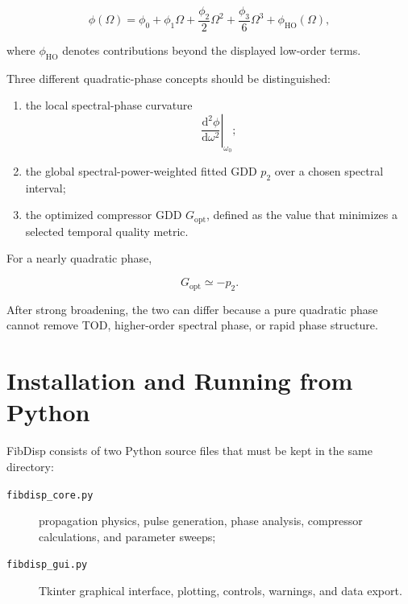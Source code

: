 \documentclass[11pt,a4paper]{article}
\newcommand{\dd}{\mathrm{d}}
\begin{document}
\begin{equation}
\phi(\Omega)
=
\phi_0+\phi_1\Omega
+\frac{\phi_2}{2}\Omega^2
+\frac{\phi_3}{6}\Omega^3
+\phi_{\mathrm{HO}}(\Omega),
\end{equation}

where $\phi_{\mathrm{HO}}$ denotes contributions beyond the displayed low-order
terms.

Three different quadratic-phase concepts should be distinguished:

\begin{enumerate}
    \item the local spectral-phase curvature
    \[
    \left.\frac{\dd^2\phi}{\dd\omega^2}\right|_{\omega_0};
    \]
    \item the global spectral-power-weighted fitted GDD $p_2$ over a chosen
    spectral interval;
    \item the optimized compressor GDD $G_{\mathrm{opt}}$, defined as the value
    that minimizes a selected temporal quality metric.
\end{enumerate}

For a nearly quadratic phase,

\begin{equation}
G_{\mathrm{opt}}\simeq-p_2.
\end{equation}

After strong broadening, the two can differ because a pure quadratic phase
cannot remove TOD, higher-order spectral phase, or rapid phase structure.

\section{Installation and Running from Python}

FibDisp consists of two Python source files that must be kept in the same
directory:

\begin{description}
    \item[\texttt{fibdisp\_core.py}] propagation physics, pulse generation,
    phase analysis, compressor calculations, and parameter sweeps;
    \item[\texttt{fibdisp\_gui.py}] Tkinter graphical interface, plotting,
    controls, warnings, and data export.
\end{description}
\end{document}
